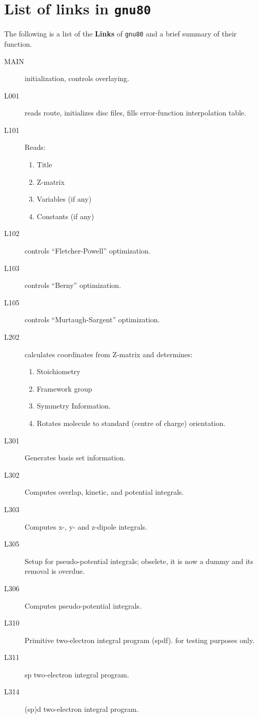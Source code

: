 \appendix
\chapter{\sf List of links in {\tt gnu80}}
\label{app3a}
The following is a list of the {\bf Links} of {\tt gnu80}
and a brief summary of their function.
\begin{description}
\item[MAIN] initialization, controls overlaying.
\item[L001]  reads route, initializes disc files, fills error-function
interpolation table.
\item[L101]     Reads:
\begin{enumerate}
\item Title
\item Z-matrix
\item Variables (if any)
\item Constants (if any)
\end{enumerate}
\item[L102]     controls ``Fletcher-Powell'' optimization.
\item[L103]     controls ``Berny'' optimization.
\item[L105]     controls ``Murtaugh-Sargent'' optimization.
\item[L202]     calculates coordinates from Z-matrix and determines:
\begin{enumerate}
\item Stoichiometry
\item Framework group
\item Symmetry Information.
\item Rotates molecule to standard (centre of charge) orientation.
\end{enumerate}
\item[L301]     Generates basis set information.
\item[L302]     Computes overlap, kinetic, and potential integrals.
\item[L303]     Computes x-, y- and z-dipole integrals.
\item[L305]     Setup for pseudo-potential integrals; obselete, it is now a
dummy and its removal is overdue.
\item[L306]     Computes pseudo-potential integrals.
\item[L310]     Primitive two-electron integral program (spdf). for testing
purposes only.
\item[L311]     sp two-electron integral program.
\item[L314]     (sp)d two-electron integral program.

\end{description}
